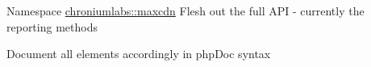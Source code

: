 \label{todo__todo000001}
\hypertarget{todo__todo000001}{}
 
\begin{DoxyDescription}
\item[Namespace \hyperlink{namespacechroniumlabs_1_1maxcdn}{chroniumlabs::maxcdn} ]Flesh out the full API -\/ currently the reporting methods 

Document all elements accordingly in phpDoc syntax 
\end{DoxyDescription}